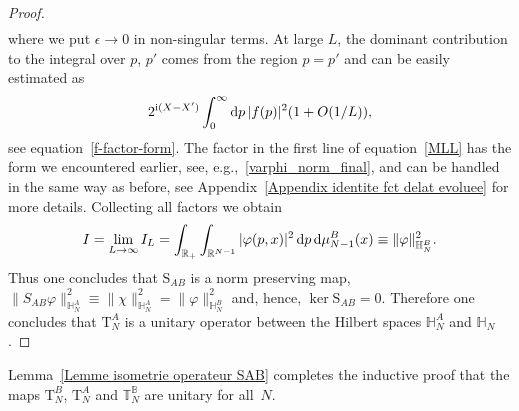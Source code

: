 \begin{proof}
\begin{align}
\end{align}
where we put $\epsilon\to 0$ in non-singular terms. At large $L$, the dominant contribution to the integral over $p$, $p'$ comes from the
region $p=p'$ and can be easily estimated as
\begin{gather*}
2^{{\rm i}(X-X')}\int_0^\infty {\rm d}p \,|f(p)|^2 (1+O(1/ L)),
\end{gather*}
see equation~\eqref{f-factor-form}. The factor in the first line of equation~\eqref{MLL} has the form we encountered earlier, see,
e.g.,~\eqref{varphi_norm_final}, and can be handled in the same way as before, see Appendix~\ref{Appendix identite fct delat evoluee} for
more details. Collecting all factors we obtain
\begin{gather*}
I=\lim_{L\to\infty} I_L=\int_{\mathbb R_+} \int_{\mathbb R^{N-1}} |\varphi(p,x)|^2 \, {\rm d}p\,{\rm d}\mu_{N-1}^B(x)\equiv \|\varphi\|^2_{\mathbb H_{N}^B}.
\end{gather*}
Thus one concludes that $\mathrm S_{AB}$ is a norm preserving map, $\|S_{AB}\varphi\|^2_{\mathbb H_N^A}\equiv\|\chi\|^2_{\mathbb H_N^A}=
\|\varphi\|^2_{\mathbb H_N^B}$ and, hence, $\ker \mathrm S_{AB}=0$. Therefore one concludes that $\mathrm T_{N}^A$ is a unitary operator
between the Hilbert spaces $\mathbb H_{N}^A$ and $\mathbb H_N$.
\end{proof}

Lemma~\ref{Lemme isometrie operateur SAB} completes the inductive proof that the maps $\mathrm T_N^B$, $\mathrm T_N^A$ and $\mathbb
T_N^{\mathbb B}$ are unitary for all~$N$.
